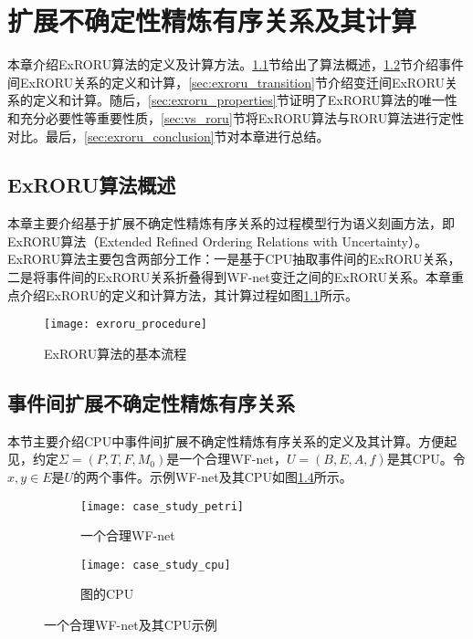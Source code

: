 
\chapter{扩展不确定性精炼有序关系及其计算}\label{cha:exroru}
本章介绍ExRORU算法的定义及计算方法。\ref{sec:exroru_intro}节给出了算法概述，\ref{sec:exroru_event}节介绍事件间ExRORU关系的定义和计算，\ref{sec:exroru_transition}节介绍变迁间ExRORU关系的定义和计算。随后，\ref{sec:exroru_properties}节证明了ExRORU算法的唯一性和充分必要性等重要性质，\ref{sec:vs_roru}节将ExRORU算法与RORU算法进行定性对比。最后，\ref{sec:exroru_conclusion}节对本章进行总结。

\section{ExRORU算法概述}\label{sec:exroru_intro}
本章主要介绍基于扩展不确定性精炼有序关系的过程模型行为语义刻画方法，即ExRORU算法（Extended Refined Ordering Relations with Uncertainty）。ExRORU算法主要包含两部分工作：一是基于CPU抽取事件间的ExRORU关系，二是将事件间的ExRORU关系折叠得到WF-net变迁之间的ExRORU关系。本章重点介绍ExRORU的定义和计算方法，其计算过程如图\ref{fig:exroru_procedure}所示。

\begin{figure}[htbp]
  \centering
  \texttt{[image: exroru\_procedure]}
  \caption{ExRORU算法的基本流程\label{fig:exroru_procedure}}
\end{figure}


\section{事件间扩展不确定性精炼有序关系}\label{sec:exroru_event}
本节主要介绍CPU中事件间扩展不确定性精炼有序关系的定义及其计算。方便起见，约定$\Sigma=(P,T,F,M_{0})$是一个合理WF-net，$U=(B,E,A,f)$是其CPU。令$x,y\in E$是$U$的两个事件。示例WF-net及其CPU如图\ref{fig:case_study}所示。

\begin{figure}[htbp]
  \centering
  \begin{subfigure}{1\textwidth}
  	\centering
  	\texttt{[image: case\_study\_petri]}
  	\caption{一个合理WF-net}
  	\label{fig:case_study_petri}
  \end{subfigure}
  \begin{subfigure}{1\textwidth}
  	\vspace{1em}
  	\centering
  	\texttt{[image: case\_study\_cpu]}
  	\caption{图的CPU}
  	\label{fig:case_study_cpu}
  \end{subfigure}
  \vspace{6pt}
  \caption{一个合理WF-net及其CPU示例}
  \label{fig:case_study}
\end{figure}


